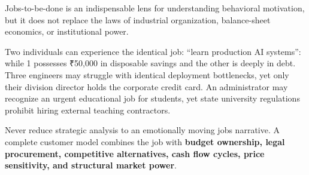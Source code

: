 Jobs-to-be-done is an indispensable lens for understanding behavioral motivation, but it does not replace the laws of industrial organization, balance-sheet economics, or institutional power.

Two individuals can experience the identical job: ``learn production AI systems'': while 1 possesses ₹50,000 in disposable savings and the other is deeply in debt. Three engineers may struggle with identical deployment bottlenecks, yet only their division director holds the corporate credit card. An administrator may recognize an urgent educational job for students, yet state university regulations prohibit hiring external teaching contractors.

Never reduce strategic analysis to an emotionally moving jobs narrative. A complete customer model combines the job with \textbf{budget ownership, legal procurement, competitive alternatives, cash flow cycles, price sensitivity, and structural market power}.
